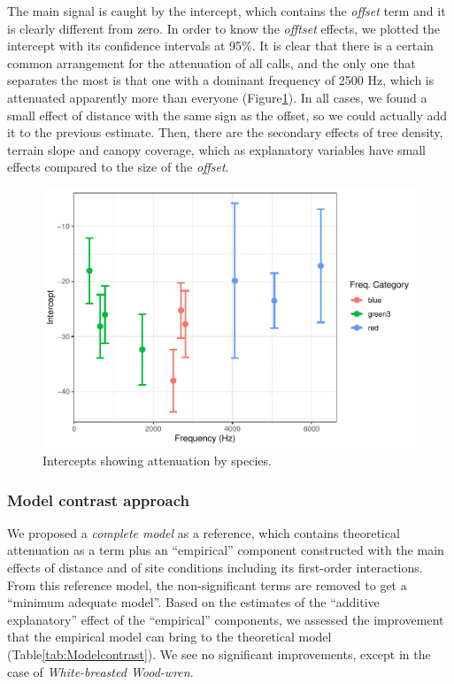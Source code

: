 \documentclass[fleqn,10pt,lineno]{wlpeerj} %
\begin{document}
The main signal is caught by the intercept, which contains the
\emph{offset} term and it is clearly different from zero. In order to
know the \emph{offtset} effects, we plotted the intercept with its
confidence intervals at 95\%. It is clear that there is a certain common
arrangement for the attenuation of all calls, and the only one that
separates the most is that one with a dominant frequency of 2500 Hz,
which is attenuated apparently more than everyone
(Figure\ref{fig:Intercepts}). In all cases, we found a small effect of
distance with the same sign as the offset, so we could actually add it
to the previous estimate. Then, there are the secondary effects of tree
density, terrain slope and canopy coverage, which as explanatory
variables have small effects compared to the size of the \emph{offset}.

\begin{figure}

{\centering \includegraphics[width=1\linewidth]{ASR_MyPaper_2020_files/figure-latex/Intercepts-1} 

}

\caption{Intercepts showing attenuation by species.\label{fig:Intercepts}}\label{fig:Intercepts}
\end{figure}

\hypertarget{model-contrast-approach}{%
\subsubsection*{Model contrast approach}\label{model-contrast-approach}}

We proposed a \emph{complete model} as a reference, which contains
theoretical attenuation as a term plus an ``empirical'' component
constructed with the main effects of distance and of site conditions
including its first-order interactions. From this reference model, the
non-significant terms are removed to get a ``minimum adequate model''.
Based on the estimates of the ``additive explanatory'' effect of the
``empirical'' components, we assessed the improvement that the empirical
model can bring to the theoretical model (Table\ref{tab:Modelcontrast}).
We see no significant improvements, except in the case of
\emph{White-breasted Wood-wren}.
\end{document}
